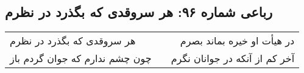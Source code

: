\begin{center}
\section*{رباعی شماره ۹۶: هر سروقدی که بگذرد در نظرم}
\label{sec:096}
\begin{longtable}{l p{0.5cm} r}
هر سروقدی که بگذرد در نظرم
&&
در هیأت او خیره بماند بصرم
\\
چون چشم ندارم که جوان گردم باز
&&
آخر کم از آنکه در جوانان نگرم
\\
\end{longtable}
\end{center}
